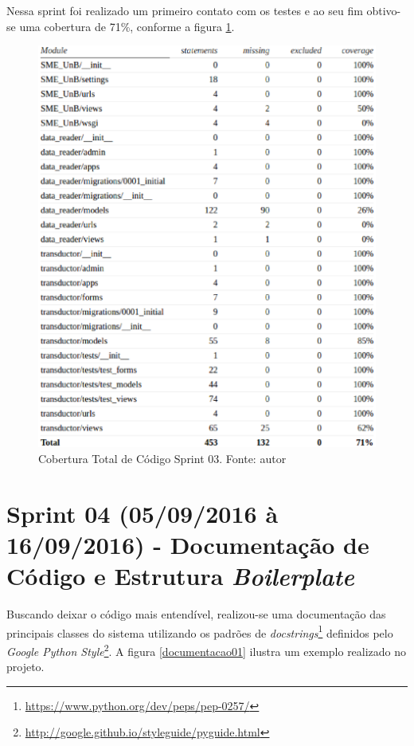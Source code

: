 \vfill
\pagebreak

Nessa sprint foi realizado um primeiro contato com os testes e ao seu fim obtivo-se uma cobertura de 71\%, conforme a figura \ref{cobertura01}.

\begin{figure}[!htpb]
    \centering
    \includegraphics[keepaspectratio=true,scale=0.5]{figuras/cobertura01.eps}
    \caption{Cobertura Total de Código Sprint 03. Fonte: autor}
    \label{cobertura01}
\end{figure}

\section{Sprint 04 (05/09/2016 à 16/09/2016) - Documentação de Código e Estrutura \textit{Boilerplate}}
Buscando deixar o código mais entendível, realizou-se uma documentação das principais classes do sistema utilizando os padrões de \textit{docstrings}\footnote{\url{https://www.python.org/dev/peps/pep-0257/}} definidos pelo \textit{Google Python Style}\footnote{\url{http://google.github.io/styleguide/pyguide.html}}. A figura \ref{documentacao01} ilustra um exemplo realizado no projeto.

